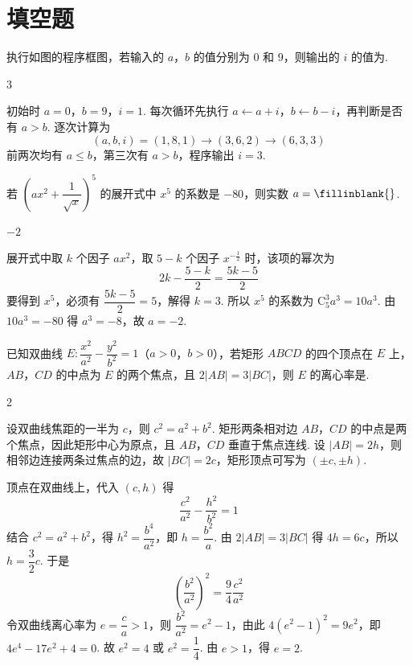 \section{填空题}

\begin{problem}
执行如图的程序框图，若输入的 \(a\)，\(b\) 的值分别为 \(0\) 和 \(9\)，则输出的 \(i\) 的值为\fillinblank{}.

\end{problem}

\begin{answer}
3
\end{answer}

\begin{solution}
初始时 \(a=0\)，\(b=9\)，\(i=1\). 每次循环先执行 \(a\leftarrow a+i\)，\(b\leftarrow b-i\)，再判断是否有 \(a>b\). 逐次计算为
\[
(a,b,i)=(1,8,1)\to(3,6,2)\to(6,3,3)
\]
前两次均有 \(a\leq b\)，第三次有 \(a>b\)，程序输出 \(i=3\).
\end{solution}

\begin{problem}
若 \(\left(ax^2+\dfrac{1}{\sqrt{x}}\right)^5\) 的展开式中 \(x^5\) 的系数是 \(-80\)，则实数 \(a=\fillinblank{}\).
\end{problem}

\begin{answer}
\(-2\)
\end{answer}

\begin{solution}
展开式中取 \(k\) 个因子 \(ax^2\)，取 \(5-k\) 个因子 \(x^{-\frac{1}{2}}\) 时，该项的幂次为
\[
2k-\frac{5-k}{2}=\frac{5k-5}{2}
\]
要得到 \(x^5\)，必须有 \(\dfrac{5k-5}{2}=5\)，解得 \(k=3\). 所以 \(x^5\) 的系数为 \(\mathrm C_5^3a^3=10a^3\). 由 \(10a^3=-80\) 得 \(a^3=-8\)，故 \(a=-2\).
\end{solution}

\begin{problem}
已知双曲线 \(E\colon\dfrac{x^2}{a^2}-\dfrac{y^2}{b^2}=1\)（\(a>0\)，\(b>0\)），若矩形 \(ABCD\) 的四个顶点在 \(E\) 上，\(AB\)，\(CD\) 的中点为 \(E\) 的两个焦点，且 \(2|AB|=3|BC|\)，则 \(E\) 的离心率是\fillinblank{}.
\end{problem}

\begin{answer}
2
\end{answer}

\begin{solution}
设双曲线焦距的一半为 \(c\)，则 \(c^2=a^2+b^2\). 矩形两条相对边 \(AB\)，\(CD\) 的中点是两个焦点，因此矩形中心为原点，且 \(AB\)，\(CD\) 垂直于焦点连线. 设 \(|AB|=2h\)，则相邻边连接两条过焦点的边，故 \(|BC|=2c\)，矩形顶点可写为 \((\pm c,\pm h)\).

顶点在双曲线上，代入 \((c,h)\) 得
\[
\frac{c^2}{a^2}-\frac{h^2}{b^2}=1
\]
结合 \(c^2=a^2+b^2\)，得 \(h^2=\dfrac{b^4}{a^2}\)，即 \(h=\dfrac{b^2}{a}\). 由 \(2|AB|=3|BC|\) 得 \(4h=6c\)，所以 \(h=\dfrac32c\). 于是
\[
\left(\frac{b^2}{a^2}\right)^2=\frac94\frac{c^2}{a^2}
\]
令双曲线离心率为 \(e=\dfrac ca>1\)，则 \(\dfrac{b^2}{a^2}=e^2-1\)，由此 \(4(e^2-1)^2=9e^2\)，即 \(4e^4-17e^2+4=0\).
故 \(e^2=4\) 或 \(e^2=\dfrac14\). 由 \(e>1\)，得 \(e=2\).
\end{solution}

